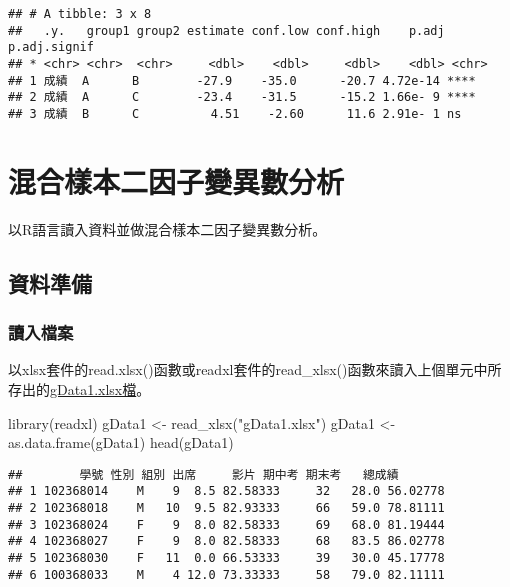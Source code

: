 \documentclass[
]{book}
\newenvironment{Shaded}{\begin{snugshade}}{\end{snugshade}}
\newcommand{\FunctionTok}[1]{\textcolor[rgb]{0.00,0.00,0.00}{#1}}
\newcommand{\NormalTok}[1]{#1}
\newcommand{\OtherTok}[1]{\textcolor[rgb]{0.56,0.35,0.01}{#1}}
\newcommand{\StringTok}[1]{\textcolor[rgb]{0.31,0.60,0.02}{#1}}
\begin{document}
\begin{verbatim}
## # A tibble: 3 x 8
##   .y.   group1 group2 estimate conf.low conf.high    p.adj p.adj.signif
## * <chr> <chr>  <chr>     <dbl>    <dbl>     <dbl>    <dbl> <chr>       
## 1 成績  A      B        -27.9    -35.0      -20.7 4.72e-14 ****        
## 2 成績  A      C        -23.4    -31.5      -15.2 1.66e- 9 ****        
## 3 成績  B      C          4.51    -2.60      11.6 2.91e- 1 ns
\end{verbatim}

\hypertarget{mixed2way}{%
\chapter{混合樣本二因子變異數分析}\label{mixed2way}}

以R語言讀入資料並做混合樣本二因子變異數分析。

\hypertarget{ux8cc7ux6599ux6e96ux5099-2}{%
\section{資料準備}\label{ux8cc7ux6599ux6e96ux5099-2}}

\hypertarget{ux8b80ux5165ux6a94ux6848-5}{%
\subsection{讀入檔案}\label{ux8b80ux5165ux6a94ux6848-5}}

以xlsx套件的read.xlsx()函數或readxl套件的read\_xlsx()函數來讀入上個單元中所存出的\href{https://docs.google.com/spreadsheets/d/1qx6T0brgzuigBpS0p-Wq8hVSFFku9ebV/edit\#gid=390389518}{gData1.xlsx檔}。

\begin{Shaded}
\begin{Highlighting}[]
\FunctionTok{library}\NormalTok{(readxl)}
\NormalTok{gData1 }\OtherTok{\textless{}{-}} \FunctionTok{read\_xlsx}\NormalTok{(}\StringTok{"gData1.xlsx"}\NormalTok{)}
\NormalTok{gData1 }\OtherTok{\textless{}{-}} \FunctionTok{as.data.frame}\NormalTok{(gData1)}
\FunctionTok{head}\NormalTok{(gData1)}
\end{Highlighting}
\end{Shaded}

\begin{verbatim}
##        學號 性別 組別 出席     影片 期中考 期末考   總成績
## 1 102368014    M    9  8.5 82.58333     32   28.0 56.02778
## 2 102368018    M   10  9.5 82.93333     66   59.0 78.81111
## 3 102368024    F    9  8.0 82.58333     69   68.0 81.19444
## 4 102368027    F    9  8.0 82.58333     68   83.5 86.02778
## 5 102368030    F   11  0.0 66.53333     39   30.0 45.17778
## 6 100368033    M    4 12.0 73.33333     58   79.0 82.11111
\end{verbatim}
\end{document}
